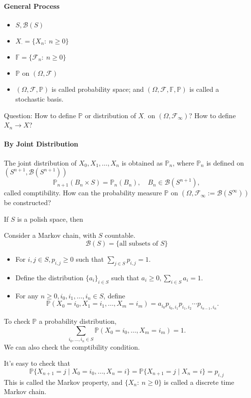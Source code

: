 \paragraph{General Process}
\begin{itemize}
\item
$S,\mathcal{B}(S)$
\item
$X_{\cdot}=\{X_n:~n\ge0\}$
\item
$\mathbb{F}=\{\mathcal{F}_n:~n\ge0\}$
\item
$\mathbb{P}$ on $(\Omega,\mathcal{F})$
\item
$(\Omega,\mathcal{F},\mathbb{P})$ is called probability space;
and 
$(\Omega,\mathcal{F},\mathbb{F},\mathbb{P})$ is called a stochastic basis.
\end{itemize}

Question: 
How to define $\mathbb{P}$ or distribution of $X_{\cdot}$ on $(\Omega,\mathcal{F}_\infty)$?
How to define $X_n\to X$?

\paragraph{By Joint Distribution}
The joint distribution of $X_0,X_1,\ldots,X_n$ is obtained as $\mathbb{P}_n$, where $\mathbb{P}_n$ is defined on $(S^{n+1},\mathcal{B}(S^{n+1}))$
\[
\mathbb{P}_{n+1}(B_n\times S) = \mathbb{P}_n(B_n),\quad
B_n\in\mathcal{B}(S^{n+1}),
\]
called comptibility.
How can the probability measure $\mathbb{P}$ on $(\Omega,\mathcal{F}_\infty:=\mathcal{B}(S^{\infty}))$ be constructed?

\begin{theorem}
If $S$ is a polish space, then 
\end{theorem}


\begin{example}
Consider a Markov chain, with $S$ countable.
\[
\mathcal{B}(S)=\{\mbox{all subsets of $S$}\}
\]
\begin{itemize}
\item
For $i,j\in S, p_{i,j}\ge0$ such that $\sum_{j\in S}p_{i,j}=1$.
\item
Define the distribution $\{a_i\}_{i\in S}$ such that $a_i\ge0, \sum_{i\in S}a_i = 1$.
\item
For any $n\ge0, i_0,i_1,\ldots,i_n\in S$, define
\[
\mathbb{P}(X_0 = i_0,X_1=i_1,\ldots,X_m = i_m)
=
a_{i_0}p_{i_0,i_1}p_{i_1,i_2}\cdots p_{i_{n-1},i_n}.
\]
\end{itemize}
To check $\mathbb{P}$ a probability distribution,
\[
\sum_{i_0,\ldots,i_n\in S}\mathbb{P}(X_0=i_0,\ldots,X_m=i_m)=1.
\]
We can also check the comptibility condition.

It's easy to check that
\[
\mathbb{P}\{X_{n+1}=j\mid X_0=i_0,\ldots,X_n=i\}=
\mathbb{P}\{X_{n+1}=j\mid X_n=i\}=p_{i,j}
\]
This is called the Markov property, and $\{X_n:~n\ge0\}$ is called a discrete time Markov chain.
\end{example}

